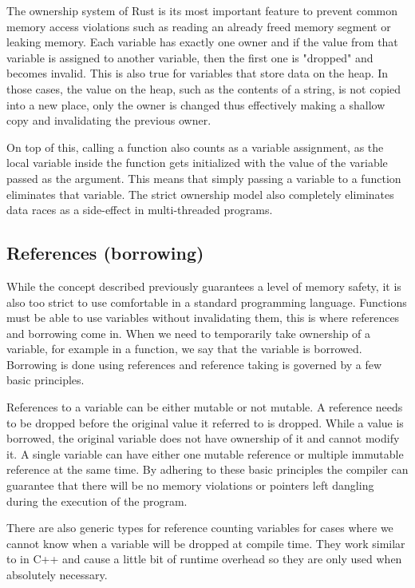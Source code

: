 The ownership system of Rust is its most important feature to prevent common memory access violations such as reading an already freed memory segment or leaking memory. Each variable has exactly one owner and if the value from that variable is assigned to another variable, then the first one is "dropped" and becomes invalid. This is also true for variables that store data on the heap. In those cases, the value on the heap, such as the contents of a string, is not copied into a new place, only the owner is changed thus effectively making a shallow copy and invalidating the previous owner.

On top of this, calling a function also counts as a variable assignment, as the local variable inside the function gets initialized with the value of the variable passed as the argument. This means that simply passing a variable to a function eliminates that variable. The strict ownership model also completely eliminates data races as a side-effect in multi-threaded programs.

\subsection{References (borrowing)}

While the concept described previously guarantees a level of memory safety, it is also too strict to use comfortable in a standard programming language. Functions must be able to use variables without invalidating them, this is where references and borrowing come in. When we need to temporarily take ownership of a variable, for example in a function, we say that the variable is borrowed. Borrowing is done using references and reference taking is governed by a few basic principles.

References to a variable can be either mutable or not mutable. A reference needs to be dropped before the original value it referred to is dropped. While a value is borrowed, the original variable does not have ownership of it and cannot modify it. A single variable can have either one mutable reference or multiple immutable reference at the same time. By adhering to these basic principles the compiler can guarantee that there will be no memory violations or pointers left dangling during the execution of the program.

There are also generic types for reference counting variables for cases where we cannot know when a variable will be dropped at compile time. They work similar to  in C++ and cause a little bit of runtime overhead so they are only used when absolutely necessary.

